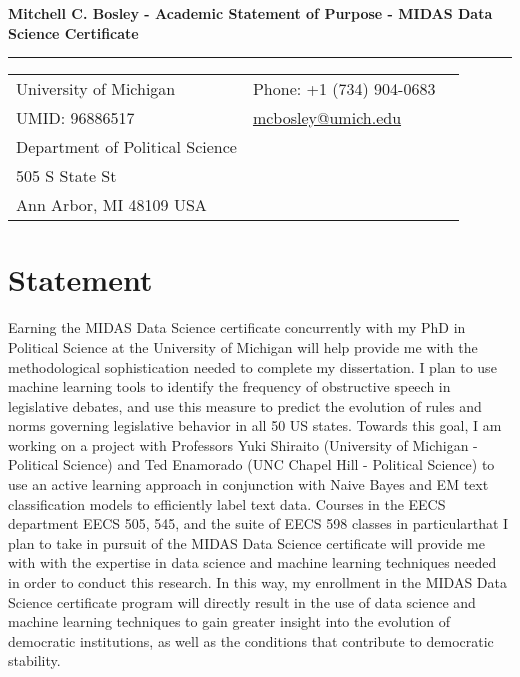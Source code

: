 \documentclass[letterpaper,11pt,oneside]{article}
\begin{document}
\vspace{2em}

\newpage

\noindent  \LARGE{\textbf{Mitchell C. Bosley - Academic Statement of Purpose - MIDAS Data Science Certificate}}  \\
\vspace{-2ex}
\hrule
\normalsize


\bigskip
\noindent \begin{tabular}{@{} l l l}
 University of Michigan & \hspace{1in} Phone: +1 (734) 904-0683\\
 UMID: 96886517 & \hspace{1in} \href{mailto:mcbosley@umich.edu}{mcbosley@umich.edu} \\
 Department of Political Science &  \\  
 505 S State St & \\ 
 Ann Arbor, MI 48109 USA & \\
\end{tabular}
\section*{Statement}
\doublespacing
Earning the MIDAS Data Science certificate concurrently with my PhD in Political Science at the University of Michigan will help provide me with the methodological sophistication needed to complete my dissertation. 
I plan to use machine learning tools to identify the frequency of obstructive speech in legislative debates, and use this measure to predict the evolution of rules and norms governing legislative behavior in all 50 US states.
Towards this goal, I am working on a project with Professors Yuki Shiraito (University of Michigan - Political Science) and Ted Enamorado (UNC Chapel Hill - Political Science) to use an active learning approach in conjunction with Naive Bayes and EM text classification models to efficiently label text data.
Courses in the EECS department \textemdash EECS 505, 545, and the suite of EECS 598 classes in particular\textemdash that I plan to take in pursuit of the MIDAS Data Science certificate will provide me with with the expertise in data science and machine learning techniques needed in order to conduct this research.
In this way, my enrollment in the MIDAS Data Science certificate program will directly result in the use of data science and machine learning techniques to gain greater insight into the evolution of democratic institutions, as well as the conditions that contribute to democratic stability.
\end{document}
